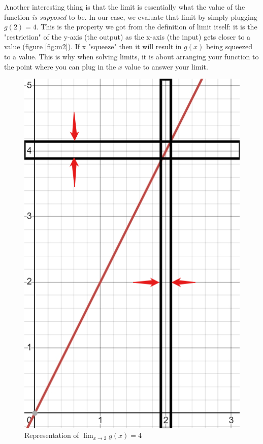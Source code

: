 Another interesting thing is that the limit is essentially what the value of the function \textit{is supposed} to be. In our case, we evaluate that limit by simply plugging $g(2)=4$. This is the property we got from the definition of limit itself: it is the "restriction" of the y-axis (the output) as the x-axis (the input) gets closer to a value (figure \ref{fig:m2}). If x "squeeze" then it will result in $g(x)$ being squeezed to a value. This is why when solving limits, it is about arranging your function to the point where you can plug in the $x$ value to answer your limit.
\begin{figure}
    \centering
    \begin{minipage}{.4\textwidth}
        \centering
        \includegraphics[width=0.9\linewidth]{math/2.png}
        \caption{Representation of $\lim_{x\to2}g(x)=4$}

\end{minipage}
\end{figure}
